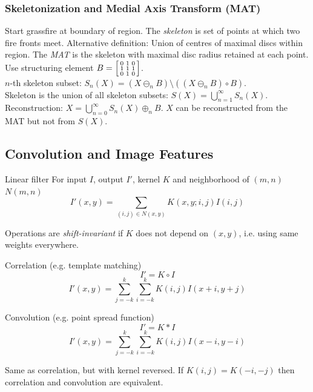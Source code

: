 \documentclass[a4paper,10pt]{article}
\begin{document}
\subsubsection{Skeletonization and Medial Axis Transform (MAT)}
Start grassfire at boundary of region. The \emph{skeleton} is set of points at which two fire fronts meet. Alternative definition: Union of centres of maximal discs within region. The \emph{MAT} is the skeleton with maximal disc radius retained at each point.\\
Use structuring element \(B = \begin{bsmallmatrix}0&1&0\\1&1&1\\0&1&0\end{bsmallmatrix}\).\\
\(n\)-th skeleton subset: \(S_n(X) = (X \ominus_n B) \setminus ((X \ominus_n B) \circ B)\).\\
Skeleton is the union of all skeleton subsets: \(S(X) = \bigcup_{n=1}^\infty S_n(X)\).\\
Reconstruction: \(X = \bigcup_{n=0}^\infty S_n(X) \oplus_n B\). \(X\) can be reconstructed from the MAT but not from \(S(X)\).

\subsection{Convolution and Image Features}
\begin{subbox}{Linear filter}
    For input \(I\), output \(I'\), kernel \(K\) and neighborhood of \((m, n)\) \(N(m, n)\)
    \[I'(x, y) = \sum_{(i, j) \in N(x, y)} K(x, y; i, j) I(i, j)\]
\end{subbox}
Operations are \emph{shift-invariant} if \(K\) does not depend on \((x, y)\), i.e. using same weights everywhere.
\begin{mainbox}{Correlation \small (e.g. template matching)}
    \[I' = K \circ I\]
    \[I'(x, y) = \sum_{j = -k}^k \sum_{i = -k}^k K(i, j) I(x + i, y + j)\]
\end{mainbox}
\begin{mainbox}{Convolution \small (e.g. point spread function)}
    \[I' = K * I\]
    \[I'(x, y) = \sum_{j = -k}^k \sum_{i = -k}^k K(i, j) I(x - i, y - i)\]
\end{mainbox}
Same as correlation, but with kernel reversed. If \(K(i, j) = K(-i, -j)\) then correlation and convolution are equivalent.
\end{document}
